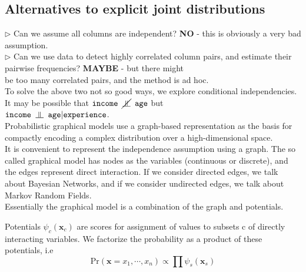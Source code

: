 \subsection{Alternatives to explicit joint distributions}
$\triangleright$ Can we assume all columns are independent? \textbf{NO} - this is obviously a very bad assumption. \\
\noindent$\triangleright$ Can we use data to detect highly correlated column pairs, and estimate their pairwise frequencies? \textbf{MAYBE} - but there might\\\noindent be too many correlated pairs, and the method is ad hoc.\\
\noindent To solve the above two not so good ways, we explore conditional independencies. It may be possible that $\texttt{income } \cancel{\ind} \texttt{ age}$ but \\\noindent$\texttt{income } {\ind} \texttt{ age}|\texttt{experience}$. \\
Probabilistic graphical models use a graph-based representation as the basis for compactly
encoding a complex distribution over a high-dimensional space. \\
It is convenient to represent the independence assumption using a graph. The so called graphical model has nodes as the variables (continuous or discrete), and the edges represent direct interaction. If we consider directed edges, we talk about Bayesian Networks, and if we consider undirected edges, we talk about Markov Random Fields. \\
Essentially the graphical model is a combination of the graph and potentials.
\begin{defn}[Potentials]
Potentials $\psi_c(\mathbf x_c)$ are scores for assignment of values to subsets c of directly
interacting variables. We factorize the probability as a product of these potentials, i.e
\begin{equation}
	\text{Pr}(\mathbf x = x_1, \cdots, x_n) \propto \prod \psi_s(\mathbf x_s)
\end{equation}
\end{defn}

